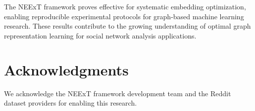 \documentclass[linenumbers]{aastex701}
\begin{document}
The NEExT framework proves effective for systematic embedding optimization, enabling reproducible experimental protocols for graph-based machine learning research. These results contribute to the growing understanding of optimal graph representation learning for social network analysis applications.

\section{Acknowledgments}

We acknowledge the NEExT framework development team and the Reddit dataset providers for enabling this research.



\end{document}
